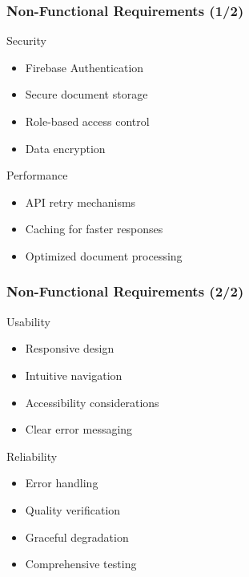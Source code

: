\documentclass{beamer}
\begin{document}
\begin{frame}
  \frametitle{Non-Functional Requirements (1/2)}
  
  \begin{block}{\textcolor{rxwhite}{Security}}
    \begin{itemize}
      \item Firebase Authentication
      \item Secure document storage
      \item Role-based access control
      \item Data encryption
    \end{itemize}
  \end{block}
  
  \begin{block}{\textcolor{rxwhite}{Performance}}
    \begin{itemize}
      \item API retry mechanisms
      \item Caching for faster responses
      \item Optimized document processing
    \end{itemize}
  \end{block}
\end{frame}

\begin{frame}
  \frametitle{Non-Functional Requirements (2/2)}
  
  \begin{block}{\textcolor{rxwhite}{Usability}}
    \begin{itemize}
      \item Responsive design
      \item Intuitive navigation
      \item Accessibility considerations
      \item Clear error messaging
    \end{itemize}
  \end{block}
  
  \begin{block}{\textcolor{rxwhite}{Reliability}}
    \begin{itemize}
      \item Error handling
      \item Quality verification
      \item Graceful degradation
      \item Comprehensive testing
    \end{itemize}
  \end{block}
\end{frame}
\end{document}
